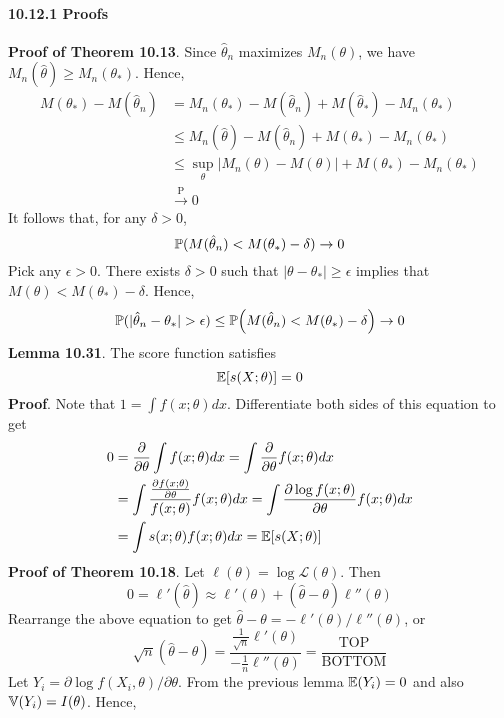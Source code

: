 \paragraph{10.12.1 Proofs}\label{proofs}
\textbf{Proof of Theorem 10.13}. Since \(\hat{\theta}_{n}\) maximizes
\(M_{n}(\theta)\), we have \(M_{n}(\hat{\theta}) \geq M_{n}(\theta_{*})\).
Hence,
\begin{align*}
M(\theta_{*}) - M(\hat{\theta}_{n}) 
&= M_{n}(\theta_{*}) - M(\hat{\theta}_{n}) + M(\hat{\theta}_{*}) - M_{n}(\theta_{*}) \\
&\leq M_{n}(\hat{\theta}) - M(\hat{\theta}_{n}) + M(\theta_{*}) - M_{n}(\theta_{*}) \\
&\leq \sup_\theta | M_{n}(\theta) - M(\theta) |  + M(\theta_{*})  - M_{n}(\theta_{*}) \\
&\xrightarrow{\textrm{P}} 0
\end{align*}
It follows that, for any \(\delta > 0\),
\[
\operatorname{\mathbb{P}}(M(\hat{\theta}_{n}) < M(\theta_{*}) - \delta) \rightarrow 0
\]
Pick any \(\epsilon > 0\). There exists \(\delta > 0\) such that
\(|\theta - \theta_{*}| \geq \epsilon\) implies that
\(M(\theta) < M(\theta_{*}) - \delta\). Hence,
\[
\PROB(|\hat{\theta}_{n} - \theta_{*}| > \epsilon) \leq 
\PROB\left( M(\hat{\theta}_{n}) < M(\theta_{*}) - \delta \right) \rightarrow 0
\]
\textbf{Lemma 10.31}. The score function satisfies
\[
\operatorname{\mathbb{E}}[s(X; \theta)] = 0
\]
\textbf{Proof}. Note that \(1 = \int f(x; \theta) dx\). Differentiate
both sides of this equation to get
\begin{align*}
0 &= \frac{\partial}{\partial \theta} \int f(x; \theta)dx = \int \frac{\partial}{\partial \theta} f(x; \theta) dx \\
&= \int \frac{\frac{\partial f(x; \theta)}{\partial \theta}}{f(x; \theta)} f(x; \theta) dx
= \int \frac{\partial \log f(x; \theta)}{\partial \theta} f(x; \theta) dx \\
&= \int s(x; \theta) f(x; \theta) dx = \operatorname{\mathbb{E}}[s(X; \theta)]
\end{align*}
\textbf{Proof of Theorem 10.18}. Let
\(\ell(\theta) = \log \mathcal{L}(\theta)\). Then
\[
0 = \ell'(\hat{\theta}) \approx \ell'(\theta) + (\hat{\theta} - \theta) \ell''(\theta)
\]
Rearrange the above equation to get
\(\hat{\theta} - \theta = -\ell'(\theta) / \ell''(\theta)\), or
\[
\sqrt{n}(\hat{\theta} - \theta) = \frac{\frac{1}{\sqrt{n}}\ell'(\theta)}{-\frac{1}{n}\ell''(\theta)} = \frac{\text{TOP}}{\text{BOTTOM}}
\]
Let \(Y_{i} = \partial \log f(X_{i}, \theta) / \partial \theta\). From the
previous lemma \(\operatorname{\mathbb{E}}(Y_{i}) = 0\) and also
\(\operatorname{\mathbb{V}}(Y_{i}) = I(\theta)\). Hence,
